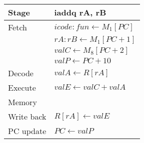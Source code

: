 \documentclass{article}
\begin{document}
\begin{tabular}{l l}
\hline
Stage & iaddq rA, rB \\
\hline
Fetch & $icode:fun \leftarrow M_1[PC]$ \\
& $rA:rB \leftarrow M_1[PC+1]$ \\
& $valC \leftarrow M_8[PC+2]$ \\
& $valP \leftarrow PC + 10$ \\
Decode & $valA \leftarrow R[rA]$ \\
Execute & $valE \leftarrow valC + valA$ \\
Memory & \\
Write back & $R[rA] \leftarrow valE$ \\
PC update & $PC \leftarrow valP$
\end{tabular}
\end{document}
